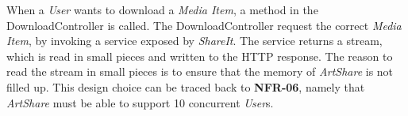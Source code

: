 \documentclass[../report.tex]{subfiles}
\begin{document}
When a \textit{User} wants to download a \textit{Media Item}, a method in the DownloadController is called. The DownloadController request the correct \textit{Media Item}, by invoking a service exposed by \textit{ShareIt}. The service returns a stream, which is read in small pieces and written to the HTTP response. The reason to read the stream in small pieces is to ensure that the memory of \textit{ArtShare} is not filled up. This design choice can be traced back to \textbf{NFR-06}, namely that \textit{ArtShare} must be able to support 10 concurrent \textit{User}s. 
\end{document}
